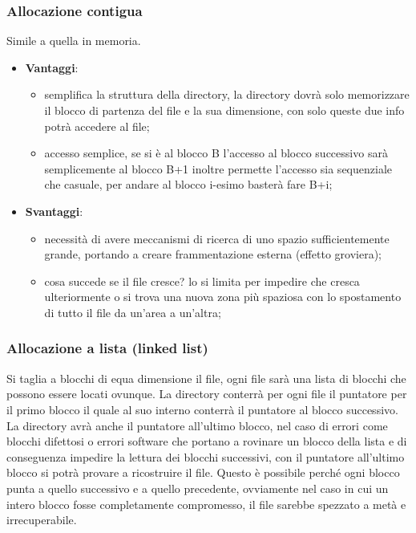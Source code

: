 \documentclass[a4paper, 12pt]{book}
\begin{document}
\subsubsection{Allocazione contigua}

Simile a quella in memoria.
\begin{itemize}
    \item \textbf{Vantaggi}:
    \begin{itemize}
        \item semplifica la struttura della directory, 
        la directory dovrà solo memorizzare il blocco 
        di partenza del file e la sua dimensione, con solo 
        queste due info potrà accedere al file;
        \item accesso semplice, se si è al blocco B l'accesso 
        al blocco successivo sarà semplicemente al blocco B+1
        inoltre permette l'accesso sia sequenziale che casuale, 
        per andare al blocco i-esimo basterà fare B+i;
    \end{itemize}
    \item \textbf{Svantaggi}:
    \begin{itemize}
        \item necessità di avere meccanismi di ricerca di
        uno spazio sufficientemente grande, portando a creare
        frammentazione esterna (effetto groviera);
        \item cosa succede se il file cresce? lo si limita 
        per impedire che cresca ulteriormente o si trova una 
        nuova zona più spaziosa con lo spostamento di tutto 
        il file da un'area a un'altra;
    \end{itemize}
\end{itemize}

\subsubsection{Allocazione a lista (linked list)}

Si taglia a blocchi di equa dimensione il file, ogni 
file sarà una lista di blocchi che possono essere 
locati ovunque. La directory conterrà per ogni file il 
puntatore per il primo blocco il quale al suo interno 
conterrà il puntatore al blocco successivo. La directory
avrà anche il puntatore all'ultimo blocco, nel caso di 
errori come blocchi difettosi o errori software che portano 
a rovinare un blocco della lista e di conseguenza impedire 
la lettura dei blocchi successivi, con il puntatore 
all'ultimo blocco si potrà provare a ricostruire il file.
Questo è possibile perché ogni blocco punta a quello successivo 
e a quello precedente, ovviamente nel caso in cui un intero 
blocco fosse completamente compromesso, il file sarebbe 
spezzato a metà e irrecuperabile. 
\end{document}
